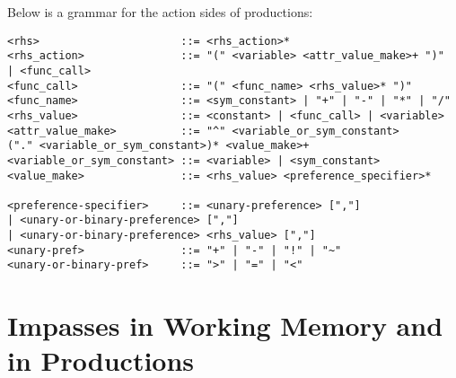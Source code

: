 
Below is a grammar for the action sides of productions:
\begin{verbatim}
<rhs>                      ::= <rhs_action>*
<rhs_action>               ::= "(" <variable> <attr_value_make>+ ")" 
| <func_call>
<func_call>                ::= "(" <func_name> <rhs_value>* ")"
<func_name>                ::= <sym_constant> | "+" | "-" | "*" | "/"
<rhs_value>                ::= <constant> | <func_call> | <variable>
<attr_value_make>          ::= "^" <variable_or_sym_constant>
("." <variable_or_sym_constant>)* <value_make>+
<variable_or_sym_constant> ::= <variable> | <sym_constant>
<value_make>               ::= <rhs_value> <preference_specifier>*

<preference-specifier>     ::= <unary-preference> [","]
| <unary-or-binary-preference> [","]
| <unary-or-binary-preference> <rhs_value> [","]
<unary-pref>               ::= "+" | "-" | "!" | "~"
<unary-or-binary-pref>     ::= ">" | "=" | "<"
\end{verbatim}






\section{Impasses in Working Memory and in Productions}
\label{SYNTAX-impasses}


